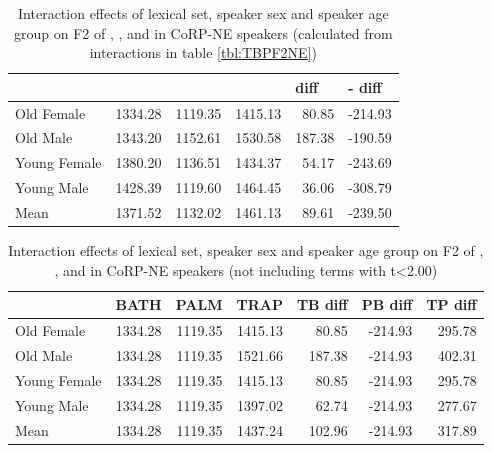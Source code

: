 \documentclass[../../00.FullDoc/tex/Thesis]{subfiles}
\begin{document}

\begin{table}[htbp]
	\centering
	\begin{tabular}{lrrrrr}
		\hline
		& \multicolumn{1}{l}{\bath{}} & \multicolumn{1}{l}{\palm{}} & \multicolumn{1}{l}{\trap{}} & \multicolumn{1}{l}{\TB{} diff} & \multicolumn{1}{l}{\palm{}-\bath{} diff} \\
		\hline
		Old Female & 1334.28 & 1119.35 & 1415.13 & 80.85 & -214.93 \\
		Old Male & 1343.20 & 1152.61 & 1530.58 & 187.38 & -190.59 \\
		Young Female & 1380.20 & 1136.51 & 1434.37 & 54.17 & -243.69 \\
		Young Male & 1428.39 & 1119.60 & 1464.45 & 36.06 & -308.79 \\
		Mean  & 1371.52 & 1132.02 & 1461.13 & 89.61 & -239.50 \\
		\hline
	\end{tabular}%
	\caption{Interaction effects of lexical set, speaker sex and speaker age group on F2 of \trap{}, \bath{}, and \palm{} in CoRP-NE speakers (calculated from interactions in table \ref{tbl:TBPF2NE})}
	\label{tbl:TBPF2NEinter}%
\end{table}%

\begin{table}[htbp]
	\centering
	\begin{tabular}{lrrrrrr}
		& \multicolumn{1}{l}{BATH} & \multicolumn{1}{l}{PALM} & \multicolumn{1}{l}{TRAP} & \multicolumn{1}{l}{TB diff} & \multicolumn{1}{l}{PB diff} & \multicolumn{1}{l}{TP diff} \\
		\hline
		Old Female & 1334.28 & 1119.35 & 1415.13 & 80.85 & -214.93 & 295.78 \\
		Old Male & 1334.28 & 1119.35 & 1521.66 & 187.38 & -214.93 & 402.31 \\
		Young Female & 1334.28 & 1119.35 & 1415.13 & 80.85 & -214.93 & 295.78 \\
		Young Male & 1334.28 & 1119.35 & 1397.02 & 62.74 & -214.93 & 277.67 \\
		\hline
		Mean  & 1334.28 & 1119.35 & 1437.24 & 102.96 & -214.93 & 317.89 \\
		\hline
	\end{tabular}%
	\caption{Interaction effects of lexical set, speaker sex and speaker age group on F2 of \trap{}, \bath{}, and \palm{} in CoRP-NE speakers (not including terms with t<2.00)}
	\label{tbl:TBPF2NEinter2}%
\end{table}%
\end{document}
